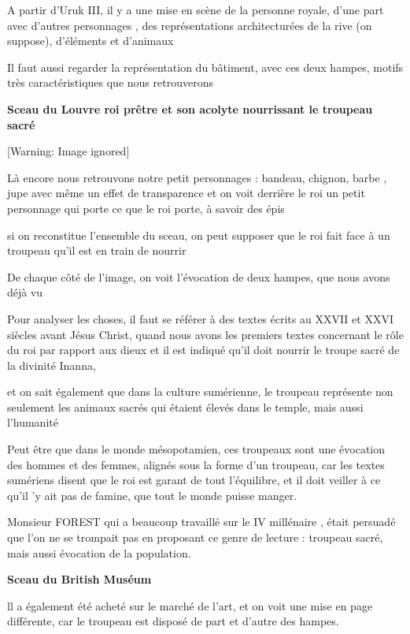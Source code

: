 \documentclass[a4paper,10pt]{article}
\begin{document}
\begin{itemize}
A partir d'Uruk III, il y a une mise en scène de la
personne royale, d'une part avec
d'autres personnages , des représentations
architecturées de la rive (on suppose), d'éléments et
d'animaux

Il faut aussi regarder la représentation du bâtiment, avec ces deux
hampes, motifs très caractéristiques que nous retrouverons

\textbf{Sceau du Louvre  roi prêtre et son acolyte nourrissant le
troupeau sacré}

  [Warning: Image ignored] %
 

Là encore nous retrouvons notre petit personnages  : bandeau, chignon,
barbe , jupe avec même un effet de transparence et on voit derrière le
roi un petit personnage qui porte ce que le roi porte, à savoir des
épis

si on reconstitue l'ensemble du sceau,  on peut
supposer que le roi fait face à un troupeau qu'il est
en train de nourrir

De chaque côté de l'image, on voit
l'évocation de deux hampes, que nous avons déjà vu

Pour analyser les choses, il faut se référer à des textes écrits au
XXVII et XXVI siècles avant Jésus Christ, quand nous avons les premiers
textes concernant le rôle du roi par rapport aux dieux et il est
indiqué qu'il doit nourrir le troupe sacré de la
divinité Inanna, 

et on sait également que dans la culture sumérienne, le troupeau
représente non seulement les animaux sacrés qui étaient élevés dans le
temple, mais aussi l'humanité

Peut être que dans le monde mésopotamien, ces troupeaux sont une
évocation des hommes et des femmes, alignés sous la forme
d'un troupeau, car les textes sumériens disent que le
roi est garant de tout l'équilibre, et il doit veiller
à ce qu'il 'y ait pas de famine, que
tout le monde puisse manger.

Monsieur FOREST qui a beaucoup travaillé sur le IV millénaire , était
persuadé que l'on ne se trompait pas en proposant ce
genre de lecture : troupeau sacré, mais aussi évocation de la
population.

\textbf{Sceau du British Muséum}

ll a également été acheté sur le marché de l'art, et on
voit une mise en page différente, car le troupeau est disposé de part
et d'autre des hampes.


\end{itemize}
\end{document}
